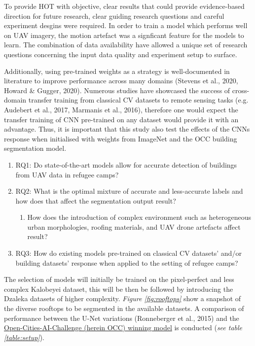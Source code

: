 \documentclass[11pt, a4paper, twoside]{report}
\begin{document}
To provide HOT with objective, clear results that could provide evidence-based direction for future research, clear guiding research questions and careful experiment desgins were required.
In order to train a model which performs well on UAV imagery, the motion artefact was a signficant feature for the models to learn. The combination of data availability have allowed a unique set of research questions concerning the input data quality and experiment setup to surface.\\\par

Additionally, using pre-trained weights as a strategy is well-documented in literature to improve performance across many domains (Stevens et al., 2020, Howard \& Gugger, 2020). Numerous studies have showcased the success of cross-domain transfer training from classical CV datasets to remote sensing tasks (e.g. Audebert et al., 2017, Marmanis et al., 2016), therefore one would expect the transfer training of CNN pre-trained on any dataset would provide it with an advantage. Thus, it is important that this study also test the effects of the CNNs response when initialised with weights from ImageNet and the OCC building segmentation model.\\\par

\begin{enumerate}
  \item RQ1: Do state-of-the-art models allow for accurate detection of buildings from UAV data in refugee camps?
  \item RQ2: What is the optimal mixture of accurate and less-accurate labels and how does that affect the segmentation output result?
  \begin{enumerate}
      \item How does the introduction of complex environment such as heterogeneous urban morphologies, roofing materials, and UAV drone artefacts affect result?
    \end{enumerate}
  \item RQ3: How do existing models pre-trained on classical CV datasets' and/or building datasets' response when applied to the setting of refugee camps?
  \end{enumerate}

The selection of models will initially be trained on the pixel-perfect and less complex Kalobeyei dataset, this will be then be followed by introducing the Dzaleka datasets of higher complexity. \textit{Figure \ref{fig:rooftops}} show a snapshot of the diverse rooftops to be segmented in the available datasets. A comparison of performance between the U-Net variations (Ronneberger et al., 2015) and the \href{https://github.com/drivendataorg/open-cities-ai-challenge/tree/master/1st\%20Place}{Open-Cities-AI-Challenge (herein OCC) winning model} is conducted (\textit{see table \ref{table:setup}}).\\\par
\end{document}
